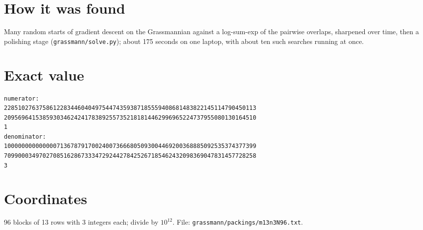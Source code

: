 \documentclass[11pt,a4paper]{article}
\begin{document}
\section{How it was found}
Many random starts of gradient descent on the Grassmannian against a log-sum-exp of the pairwise overlaps, sharpened over time, then a polishing stage (\texttt{grassmann/solve.py}); about 175 seconds on one laptop, with about ten such searches running at once.


\appendix
\section{Exact value}
{\small
\begin{verbatim}
numerator:
228510276375861228344604049754474359387185559408681483822145114790450113
209569641538593034624241783892557352181814462996965224737955080130164510
1
denominator:
100000000000000713678791700240073666805093004469200368885092535374377399
709900034970270851628673334729244278425267185462432098369047831457728258
3
\end{verbatim}}

\section{Coordinates}
96 blocks of 13 rows with 3 integers each; divide by $10^{12}$. File: \texttt{grassmann/packings/m13n3N96.txt}.
{\tiny
\begin{multicols}{3}
\end{multicols}}
\end{document}
